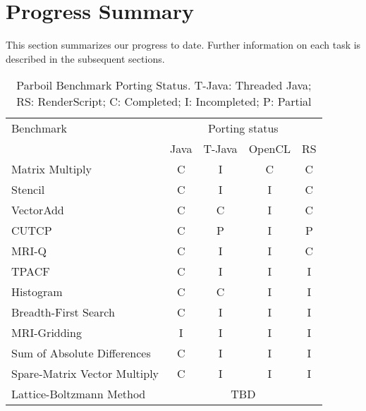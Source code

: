\section*{Progress Summary}

This section summarizes our progress to date. Further information on each task
is described in the subsequent sections.


\begin{table}[h]\small
\centering
\begin{tabular}{ | l | c | c | c | c |}
    \hline 
    Benchmark & \multicolumn{4}{|c|}{Porting status} \\ \cline{2-5}
              & Java & T-Java & OpenCL & RS \\ \hline
    Matrix Multiply & C & I & C & C \\ \hline
    Stencil & C & I & I & C \\ \hline
    VectorAdd & C & C & I & C \\ \hline
    CUTCP & C & P  & I  & P \\ \hline
    MRI-Q & C & I & I & C \\ \hline
    TPACF & C & I & I & I \\ \hline
    Histogram & C & C & I & I \\ \hline
    Breadth-First Search & C & I & I & I \\ \hline
    MRI-Gridding & I & I & I & I \\ \hline
    Sum of Absolute Differences & C & I & I & I \\ \hline
    Spare-Matrix Vector Multiply & C & I & I & I \\ \hline
    Lattice-Boltzmann Method & \multicolumn{4}{|c|}{TBD} \\ \hline
    \hline
\end{tabular}
\caption{Parboil Benchmark Porting Status. T-Java: Threaded Java; RS:
RenderScript; C: Completed; I: Incompleted; P: Partial}
\label{table:parboil}
\end{table}

